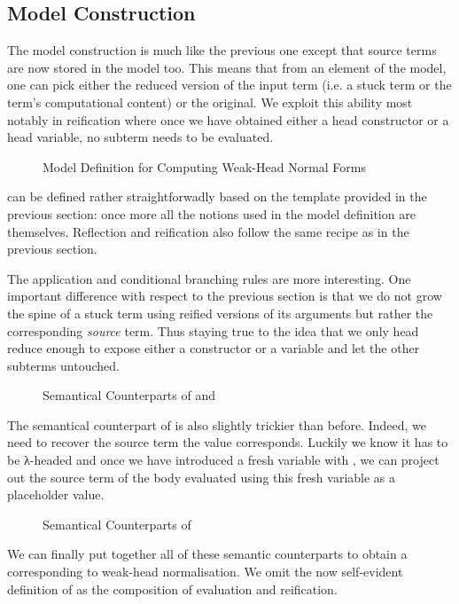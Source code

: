 \subsection{Model Construction}

The model construction is much like the previous one except
that source terms are now stored in the model too. This means that
from an element of the model, one can pick either the reduced version
of the input term (i.e. a stuck term or the term's computational
content) or the original. We exploit this ability most
notably in reification where once we have obtained either a
head constructor or a head variable, no subterm needs to
be evaluated.

\begin{figure}[h]
\caption{Model Definition for Computing Weak-Head Normal Forms\label{fig:betaiotamodel}}
\end{figure}

 can be defined rather straightforwadly based on the template provided
in the previous section: once more all the notions used in the model definition
are  themselves. Reflection and reification also follow the same recipe
as in the previous section.


The application and conditional branching rules are more
interesting. One important difference with respect to the previous
section is that we do not grow the spine of a stuck term using
reified versions of its arguments but rather the corresponding
\emph{source} term. Thus staying true to the idea that we only head
reduce enough to expose either a constructor or a variable and let
the other subterms untouched.

\begin{figure}[h]
\caption{Semantical Counterparts of  and \label{fig:betaiotaappifte}}
\end{figure}

The semantical counterpart of  is also slightly trickier than before. Indeed, we
need to recover the source term the value corresponds. Luckily we know it has to be
λ-headed and once we have introduced a fresh variable with , we can project
out the source term of the body evaluated using this fresh variable as a placeholder
value.

\begin{figure}[h]
\caption{Semantical Counterparts of \label{fig:betaiotalam}}
\end{figure}

We can finally put together all of these semantic counterparts to
obtain a  corresponding to weak-head normalisation.
We omit the now self-evident definition of  as the
composition of evaluation and reification.
